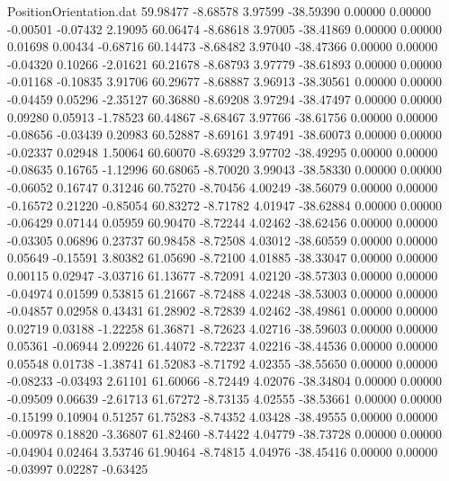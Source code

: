 \begin{filecontents}{PositionOrientation.dat}
  59.98477   -8.68578    3.97599   -38.59390    0.00000    0.00000   -0.00501   -0.07432    2.19095
  60.06474   -8.68618    3.97005   -38.41869    0.00000    0.00000    0.01698    0.00434   -0.68716
  60.14473   -8.68482    3.97040   -38.47366    0.00000    0.00000   -0.04320    0.10266   -2.01621
  60.21678   -8.68793    3.97779   -38.61893    0.00000    0.00000   -0.01168   -0.10835    3.91706
  60.29677   -8.68887    3.96913   -38.30561    0.00000    0.00000   -0.04459    0.05296   -2.35127
  60.36880   -8.69208    3.97294   -38.47497    0.00000    0.00000    0.09280    0.05913   -1.78523
  60.44867   -8.68467    3.97766   -38.61756    0.00000    0.00000   -0.08656   -0.03439    0.20983
  60.52887   -8.69161    3.97491   -38.60073    0.00000    0.00000   -0.02337    0.02948    1.50064
  60.60070   -8.69329    3.97702   -38.49295    0.00000    0.00000   -0.08635    0.16765   -1.12996
  60.68065   -8.70020    3.99043   -38.58330    0.00000    0.00000   -0.06052    0.16747    0.31246
  60.75270   -8.70456    4.00249   -38.56079    0.00000    0.00000   -0.16572    0.21220   -0.85054
  60.83272   -8.71782    4.01947   -38.62884    0.00000    0.00000   -0.06429    0.07144    0.05959
  60.90470   -8.72244    4.02462   -38.62456    0.00000    0.00000   -0.03305    0.06896    0.23737
  60.98458   -8.72508    4.03012   -38.60559    0.00000    0.00000    0.05649   -0.15591    3.80382
  61.05690   -8.72100    4.01885   -38.33047    0.00000    0.00000    0.00115    0.02947   -3.03716
  61.13677   -8.72091    4.02120   -38.57303    0.00000    0.00000   -0.04974    0.01599    0.53815
  61.21667   -8.72488    4.02248   -38.53003    0.00000    0.00000   -0.04857    0.02958    0.43431
  61.28902   -8.72839    4.02462   -38.49861    0.00000    0.00000    0.02719    0.03188   -1.22258
  61.36871   -8.72623    4.02716   -38.59603    0.00000    0.00000    0.05361   -0.06944    2.09226
  61.44072   -8.72237    4.02216   -38.44536    0.00000    0.00000    0.05548    0.01738   -1.38741
  61.52083   -8.71792    4.02355   -38.55650    0.00000    0.00000   -0.08233   -0.03493    2.61101
  61.60066   -8.72449    4.02076   -38.34804    0.00000    0.00000   -0.09509    0.06639   -2.61713
  61.67272   -8.73135    4.02555   -38.53661    0.00000    0.00000   -0.15199    0.10904    0.51257
  61.75283   -8.74352    4.03428   -38.49555    0.00000    0.00000   -0.00978    0.18820   -3.36807
  61.82460   -8.74422    4.04779   -38.73728    0.00000    0.00000   -0.04904    0.02464    3.53746
  61.90464   -8.74815    4.04976   -38.45416    0.00000    0.00000   -0.03997    0.02287   -0.63425

\end{filecontents}
